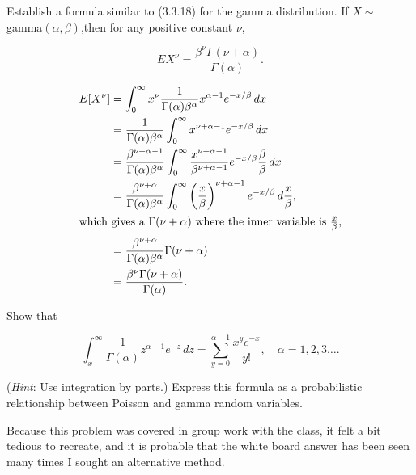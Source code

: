 \documentclass[12pt,letterpaper]{exam}
\begin{document}
\begin{questions}
	\begin{solution}
		
	\end{solution}
	
	\setcounter{question}{16}
	\question 
	Establish a formula similar to (3.3.18) for the gamma distribution. 
	If \(X \sim\) gamma\((\alpha,\beta)\),then for any positive constant \(\nu\),
	
	\[EX^\nu = \frac{\beta^\nu \Gamma (\nu+\alpha)}{\Gamma(\alpha)}.\]
	
	\begin{solution}
		\begin{align*}
			E[X^\nu]
			&= \int_{0}^{\infty} x^\nu \frac{1}{\Gamma(\alpha)\beta^\alpha} x^{\alpha-1} e^{-x/\beta} \,dx \\
			&= \frac{1}{\Gamma(\alpha)\beta^\alpha} \int_{0}^{\infty} x^{\nu+\alpha-1} e^{-x/\beta} \,dx \\
			&= \frac{\beta^{\nu+\alpha-1}}{\Gamma(\alpha)\beta^\alpha} \int_{0}^{\infty} \frac{x^{\nu+\alpha-1}}{\beta^{\nu+\alpha-1}} e^{-x/\beta} \frac{\beta}{\beta} \,dx \\
			&= \frac{\beta^{\nu+\alpha}}{\Gamma(\alpha)\beta^\alpha} \int_{0}^{\infty} \left(\frac{x}{\beta}\right)^{\nu+\alpha-1} e^{-x/\beta} \,d\frac{x}{\beta}, \\
			\intertext{which gives a \(\Gamma(\nu+\alpha)\) where the inner variable is \(\frac{x}{\beta}\),}
			&= \frac{\beta^{\nu+\alpha}}{\Gamma(\alpha)\beta^\alpha} \Gamma(\nu+\alpha) \\
			&= \frac{\beta^{\nu}\Gamma(\nu+\alpha)}{\Gamma(\alpha)}.  
		\end{align*}
	\end{solution}
	
	\setcounter{question}{18}
	\question 
	Show that
	
	\[
		\int_{x}^{\infty} \frac{1}{\Gamma(\alpha)} z^{\alpha-1}e^{-z} \,dz = 
		\sum_{y=0}^{\alpha-1} \frac{x^y e^{-x}}{y!}, \quad \alpha=1,2,3\ldots.
	\]
	
	(\textit{Hint}: Use integration by parts.) Express this formula as a probabilistic relationship
	between Poisson and gamma random variables.
	
	\begin{solution}
		Because this problem was covered in group work with the class, it felt a bit tedious to recreate, 
		and it is probable that the white board answer has been seen many times I sought an alternative method.
		

\end{solution}
\end{questions}
\end{document}
